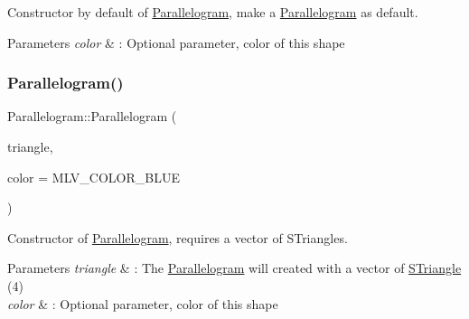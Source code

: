 Constructor by default of \hyperlink{classParallelogram}{Parallelogram}, make a \hyperlink{classParallelogram}{Parallelogram} as default. 


\begin{DoxyParams}{Parameters}
{\em color} & \+: Optional parameter, color of this shape \\
\hline
\end{DoxyParams}
\mbox{\label{classParallelogram_ac60d6fc9e306b202e9c679d170d6d063}} 
\subsubsection{\texorpdfstring{Parallelogram()}{Parallelogram()}\hspace{0.1cm}{\footnotesize\ttfamily [2/3]}}
{\footnotesize\ttfamily Parallelogram\+::\+Parallelogram (\begin{DoxyParamCaption}\item[{const std\+::vector$<$ \hyperlink{classSTriangle}{S\+Triangle} $>$ \&}]{triangle,  }\item[{M\+L\+V\+\_\+\+Color}]{color = {\ttfamily MLV\+\_\+COLOR\+\_\+BLUE} }\end{DoxyParamCaption})\hspace{0.3cm}{\ttfamily [explicit]}}



Constructor of \hyperlink{classParallelogram}{Parallelogram}, requires a vector of S\+Triangles. 


\begin{DoxyParams}{Parameters}
{\em triangle} & \+: The \hyperlink{classParallelogram}{Parallelogram} will created with a vector of \hyperlink{classSTriangle}{S\+Triangle} (4) \\
\hline
{\em color} & \+: Optional parameter, color of this shape \\
\hline
\end{DoxyParams}
\mbox{\label{classParallelogram_aeed0c83e942a4869b79d4baab00c2874}} 
